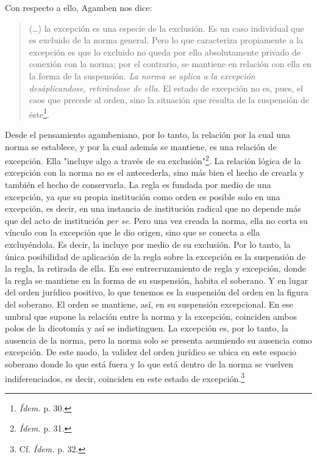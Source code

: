 Con respecto a ello, Agamben nos dice:

\begin{quote}
(\dots) la excepción es una especie de la exclusión. Es un caso
individual que es excluido de la norma general. Pero lo que caracteriza
propiamente a la excepción es que lo excluido no queda por ello
absolutamente privado de conexión con la norma; por el contrario, se
mantiene en relación con ella en la forma de la suspensión. \emph{La
norma se aplica a la excepción desáplicandose, retirándose de ella}. El
estado de excepción no es, pues, el caos que precede al orden, sino la
situación que resulta de la suspensión de éste\footnote{\emph{Ídem.} p.
  30.}.
\end{quote}

Desde el pensamiento agambeniano, por lo tanto, la relación por la cual
una norma se establece, y por la cual además se mantiene, es una
relación de excepción. Ella "incluye algo a través de su
exclusión"\footnote{\emph{Ídem.} p. 31.}. La relación lógica de la
excepción con la norma no es el antecederla, sino más bien el hecho de
crearla y también el hecho de conservarla. La regla es fundada por medio
de una excepción, ya que su propia institución como orden es posible
solo en una excepción, es decir, en una instancia de institución radical
que no depende más que del acto de institución \emph{per se}. Pero una
vez creada la norma, ella no corta su vínculo con la excepción que le
dio origen, sino que se conecta a ella excluyéndola. Es decir, la
incluye por medio de su exclusión. Por lo tanto, la única posibilidad de
aplicación de la regla sobre la excepción es la suspensión de la regla,
la retirada de ella. En ese entrecruzamiento de regla y excepción, donde
la regla se mantiene en la forma de su suspensión, habita el soberano. Y
en lugar del orden jurídico positivo, lo que tenemos es la suspensión
del orden en la figura del soberano. El orden se mantiene, así, en su
suspensión excepcional. En ese umbral que supone la relación entre la
norma y la excepción, coinciden ambos polos de la dicotomía y así se
indistinguen. La excepción es, por lo tanto, la ausencia de la norma,
pero la norma solo se presenta asumiendo su ausencia como excepción. De
este modo, la validez del orden jurídico se ubica en este espacio
soberano donde lo que está fuera y lo que está dentro de la norma se
vuelven indiferenciados, es decir, coinciden en este estado de
excepción.\footnote{Cf. \emph{Ídem.} p. 32.}

